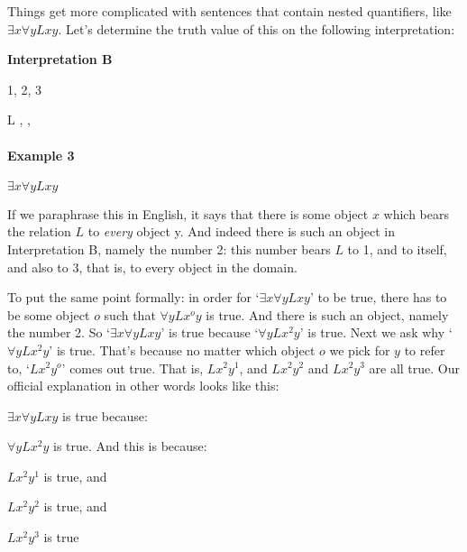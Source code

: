 Things get  more complicated with sentences that contain nested quantifiers, like $\exists x\forall yLxy$.  Let's determine the truth value of this on the following interpretation:\\

\begin{minipage}{\textwidth}
\begin{center}
\textbf{Interpretation B}
\begin{multicols}{2}
	\begin{ekey}
		\item[\text{Domain}] 1, 2, 3
		\item[L] , , 
	\end{ekey}
\columnbreak

\end{multicols}
\end{center}
\end{minipage}

\paragraph{Example 3} $\exists x\forall yLxy$

\noindent If we paraphrase this in English, it says that there is some object $x$ which bears the relation $L$ to \emph{every} object y.  And indeed there is such an object in  Interpretation B, namely the number 2: this number bears $L$ to 1, and to itself, and also to 3, that is, to every object in the domain.

To put the same point formally: in   order for `$\exists x\forall yLxy$' to be true, there has to be some object $o$ such that $\forall yLx^oy$ is true.  And there is such an object, namely the number 2.  So `$\exists x\forall yLxy$' is true because `$\forall yLx^2y$'  is true.  Next we ask why `$\forall yLx^2y$' is true.  That's because no matter which object $o$ we pick for $y$ to refer to, `$Lx^2y^o$' comes out true.  That is, $Lx^2y^1$, and $Lx^2y^2$ and $Lx^2y^3$ are all true. Our official explanation in other words looks like this:

\begin{etriangle}
\item $\exists x\forall yLxy$ is true because:
\begin{etriangle}
\item $\forall yLx^2y$ is true.  And this is because:
\begin{etriangle}
\item $Lx^2y^1$ is true, and
\item $Lx^2y^2$ is true, and
\item $Lx^2y^3$ is true
\end{etriangle}
\end{etriangle}
\end{etriangle}

